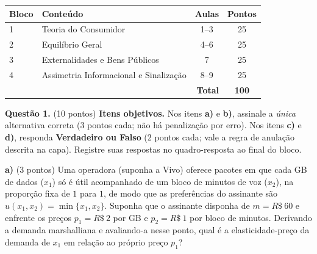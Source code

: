 
\ifsolucao\else
\begin{center}
\renewcommand{\arraystretch}{1.3}
\begin{tabular}{|l|l|c|c|}
\hline
\textbf{Bloco} & \textbf{Conteúdo} & \textbf{Aulas} & \textbf{Pontos} \\ \hline
1 & Teoria do Consumidor & 1--3 & 25 \\ \hline
2 & Equilíbrio Geral & 4--6 & 25 \\ \hline
3 & Externalidades e Bens Públicos & 7 & 25 \\ \hline
4 & Assimetria Informacional e Sinalização & 8--9 & 25 \\ \hline
\multicolumn{3}{|r|}{\textbf{Total}} & \textbf{100} \\ \hline
\end{tabular}
\end{center}
\vspace{0.5em}
\fi


\textbf{Questão 1.} (10 pontos) \textbf{Itens objetivos.} Nos itens \textbf{a)} e \textbf{b)}, assinale a \emph{única} alternativa correta (3 pontos cada; não há penalização por erro). Nos itens \textbf{c)} e \textbf{d)}, responda \textbf{Verdadeiro ou Falso} (2 pontos cada; vale a regra de anulação descrita na capa). Registre suas respostas no quadro-resposta ao final do bloco.

\textbf{a)} (3 pontos) Uma operadora (suponha a Vivo) oferece pacotes em que cada GB de dados ($x_1$) só é útil acompanhado de um bloco de minutos de voz ($x_2$), na proporção fixa de $1$ para $1$, de modo que as preferências do assinante são $u(x_1,x_2)=\min\{x_1,x_2\}$. Suponha que o assinante disponha de $m=R\$~60$ e enfrente os preços $p_1=R\$~2$ por GB e $p_2=R\$~1$ por bloco de minutos. Derivando a demanda marshalliana e avaliando-a nesse ponto, qual é a elasticidade-preço da demanda de $x_1$ em relação ao próprio preço $p_1$?

